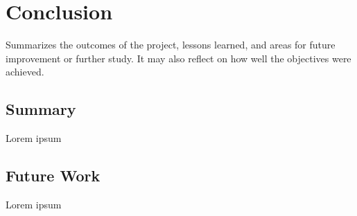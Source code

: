 \chapter{Conclusion} 

Summarizes the outcomes of the project, lessons learned, and areas for future improvement or further study. It may also reflect on how well the objectives were achieved. 

\section{Summary} Lorem ipsum 
\section{Future Work} Lorem ipsum